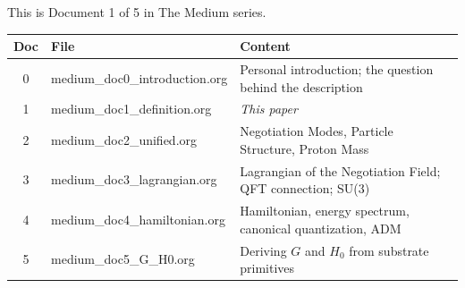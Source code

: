 \documentclass[11pt,letterpaper]{article}
\begin{document}
This is Document 1 of 5 in The Medium series.

\begin{center}
\begin{tabular}{clp{9cm}}
\toprule
\textbf{Doc} & \textbf{File} & \textbf{Content}\\[0pt]
\midrule
0 & medium\_doc0\_introduction.org & Personal introduction; the question behind the description\\[0pt]
1 & medium\_doc1\_definition.org & \emph{This paper}\\[0pt]
2 & medium\_doc2\_unified.org & Negotiation Modes, Particle Structure, Proton Mass\\[0pt]
3 & medium\_doc3\_lagrangian.org & Lagrangian of the Negotiation Field; QFT connection; SU(3)\\[0pt]
4 & medium\_doc4\_hamiltonian.org & Hamiltonian, energy spectrum, canonical quantization, ADM\\[0pt]
5 & medium\_doc5\_G\_H0.org & Deriving \(G\) and \(H_0\) from substrate primitives\\[0pt]
\bottomrule
\end{tabular}
\end{center}
\end{document}
